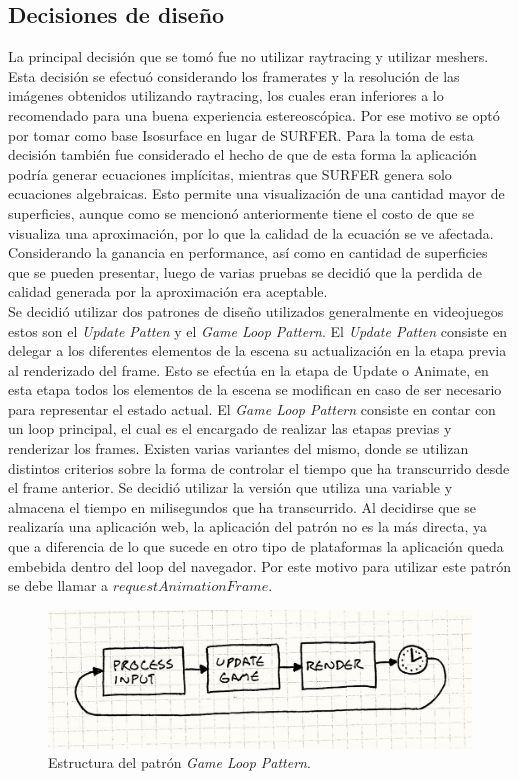 \documentclass[12pt]{article}
\begin{document}
\subsection{Decisiones de diseño}
La principal decisión que se tomó fue no utilizar raytracing y utilizar meshers. Esta decisión se efectuó considerando los framerates y la resolución de las imágenes obtenidos utilizando raytracing, los cuales eran inferiores a lo recomendado para una buena experiencia estereoscópica. Por ese motivo se optó por tomar como base Isosurface en lugar de SURFER. Para la toma de esta decisión también fue considerado el hecho de que de esta forma la aplicación podría generar ecuaciones implícitas, mientras que SURFER genera solo ecuaciones algebraicas. Esto permite una visualización de una cantidad mayor de superficies, aunque como se mencionó anteriormente tiene el costo de que se visualiza una aproximación, por lo que la calidad de la ecuación se ve afectada. Considerando la ganancia en performance, así como en cantidad de superficies que se pueden presentar, luego de varias pruebas se decidió que la perdida de calidad generada por la aproximación era aceptable.
\\Se decidió utilizar dos patrones de diseño utilizados generalmente en videojuegos estos son el \textit{Update Patten} y el \textit{Game Loop Pattern}\cite{patterns}\cite{engine}. El \textit{Update Patten} consiste en delegar a los diferentes elementos de la escena su actualización en la etapa previa al renderizado del frame. Esto se efectúa en la etapa de Update o Animate, en esta etapa todos los elementos de la escena se modifican en caso de ser necesario para representar el estado actual. El \textit{Game Loop Pattern} consiste en contar con un loop principal, el cual es el encargado de realizar las etapas previas y renderizar los frames. Existen varias variantes del mismo\cite{patterns}, donde se utilizan distintos criterios sobre la forma de controlar el tiempo que ha transcurrido desde el frame anterior. Se decidió utilizar la versión que utiliza una variable y almacena el tiempo en milisegundos que ha transcurrido. Al decidirse que se realizaría una aplicación web, la aplicación del patrón no es la más directa, ya que a diferencia de lo que sucede en otro tipo de plataformas la aplicación queda embebida dentro del loop del navegador. Por este motivo para utilizar este patrón se debe llamar a $requestAnimationFrame$\cite{patterns}.
\begin{figure}[h]
\includegraphics[width =0.7\linewidth, center]{gameloop.png}
\caption{Estructura del patrón \textit{Game Loop Pattern}\cite{patterns}.}
\label{ fig : surface }
\end{figure}
\end{document}
